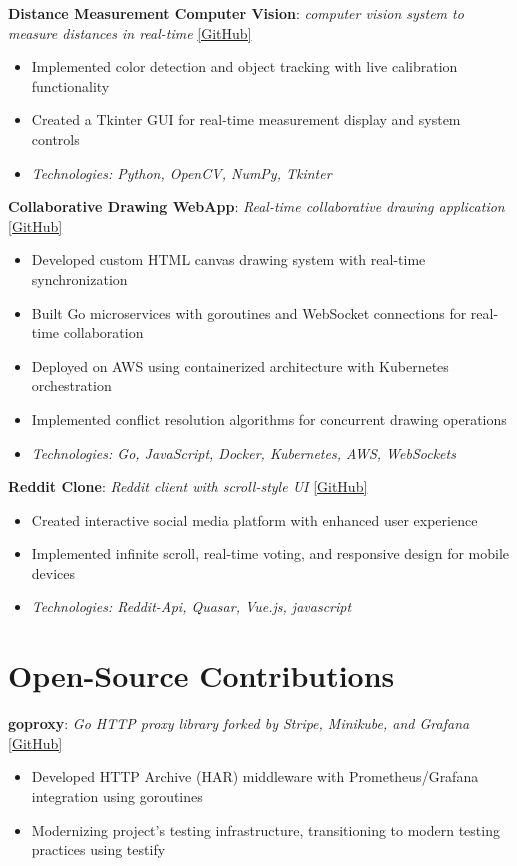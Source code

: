 \documentclass[10pt,a4paper]{article}
\begin{document}
	
	\textbf{Distance Measurement Computer Vision}: \textit{computer vision system to measure distances in real-time} \href{https://github.com/CameronBadman/computer-vision}{[GitHub]}
	\begin{itemize}[label=\textbullet, itemsep=0.05cm]
		\item Implemented color detection and object tracking with live calibration functionality
		\item Created a Tkinter GUI for real-time measurement display and system controls
		\item \textit{Technologies: Python, OpenCV, NumPy, Tkinter}
	\end{itemize}
	
	\textbf{Collaborative Drawing WebApp}: \textit{Real-time collaborative drawing application} \href{https://github.com/CameronBadman/Canvis-collab-webapp}{[GitHub]}
	\begin{itemize}[label=\textbullet, itemsep=0.05cm]
		\item Developed custom HTML canvas drawing system with real-time synchronization
		\item Built Go microservices with goroutines and WebSocket connections for real-time collaboration
		\item Deployed on AWS using containerized architecture with Kubernetes orchestration
		\item Implemented conflict resolution algorithms for concurrent drawing operations
		\item \textit{Technologies: Go, JavaScript, Docker, Kubernetes, AWS, WebSockets}
	\end{itemize}
	
	\textbf{Reddit Clone}: \textit{Reddit client with scroll-style UI} \href{https://github.com/CameronBadman/Reddit-Clone}{[GitHub]}
	\begin{itemize}[label=\textbullet, itemsep=0.05cm]
		\item Created interactive social media platform with enhanced user experience
		\item Implemented infinite scroll, real-time voting, and responsive design for mobile devices
		\item \textit{Technologies: Reddit-Api, Quasar, Vue.js, javascript}
	\end{itemize}
	
	\section{Open-Source Contributions}
	\textbf{goproxy}: \textit{Go HTTP proxy library forked by Stripe, Minikube, and Grafana} \href{https://github.com/elazarl/goproxy}{[GitHub]}
	\begin{itemize}[label=\textbullet, itemsep=0.02cm]
		\item Developed HTTP Archive (HAR) middleware with Prometheus/Grafana integration using goroutines
		\item Modernizing project's testing infrastructure, transitioning to modern testing practices using testify
	\end{itemize}
	
\end{document}
